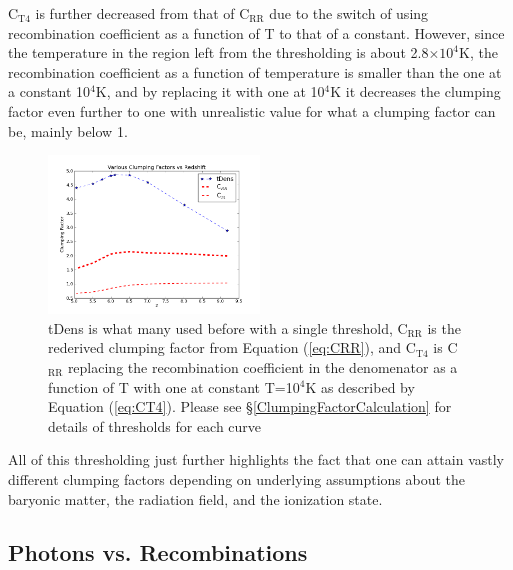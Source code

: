 \documentclass[letterpaper,10pt]{article}
\renewcommand{\(}{\left(}
\renewcommand{\)}{\right)}
\begin{document}
C$_\mathrm{T4}$ is further decreased from that of  C$_\mathrm{RR}$ due to the switch of
using recombination coefficient as a function of T to that of a constant.  However, since the
temperature in the region left from the thresholding is about 2.8$\times10^4$K, the 
recombination coefficient as a function of temperature is smaller than the one at a constant 
10$^4$K, and by replacing it with one at 10$^4$K it decreases the clumping factor even further
to one with unrealistic value for what a clumping factor can be, mainly below 1.
\begin{figure}
  \includegraphics[width=0.5\textwidth]{Clumping_vs_Redshift.png}
  \caption{\footnotesize tDens is what many used before with 
    a single threshold, C$_\mathrm{RR}$ is the rederived  clumping factor from
    Equation (\ref{eq:CRR}), and C$_\mathrm{T4}$ is C$_\mathrm{RR}$ replacing the
    recombination coefficient in the denomenator as a function of T with one at constant 
    T=10$^4$K as described by Equation (\ref{eq:CT4}).
    Please see \S\ref{ClumpingFactorCalculation} for details of thresholds for each curve}
  \label{Clumping_vs_Redshift}
\end{figure}


All of this thresholding just further highlights
the fact that one can attain vastly different clumping factors depending on
underlying assumptions about the baryonic matter, the radiation field,
and the ionization state.  




\subsection{Photons vs. Recombinations}
\end{document}
